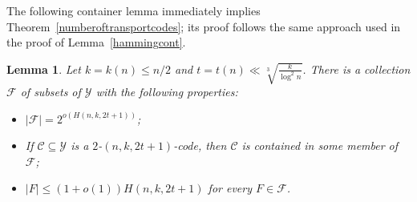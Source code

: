 \documentclass[11pt]{article}
\newtheorem{lemma}[theorem]{Lemma}
\numberwithin{equation}{section}
\begin{document}
The following container lemma immediately implies Theorem~\ref{numberoftransportcodes}; its proof follows the same approach used in the proof of Lemma~\ref{hammingcont}.
\begin{lemma}\label{hammingcont2} Let $k=k(n)\leq n/2$ and $t=t(n)\ll \sqrt[3]{\frac{ k}{\log^2 n}}$. There is a collection $\mathcal F $ of subsets of $\mathcal Y$ with the following properties:
\begin{itemize}
\item[(i)]  $|\mathcal F|=2^{o(H(n,k,2t+1))}$;
\item[(ii)] If $\mathcal C \subseteq \mathcal Y$ is a $2$-$(n,k,2t+1)$-code, then $\mathcal C$ is contained in some member of $\mathcal F$;
\item[(iii)] $|F|\leq (1+o(1))H(n,k,2t+1)$ for every $F \in \mathcal F$.
\end{itemize}
\end{lemma}
\end{document}

